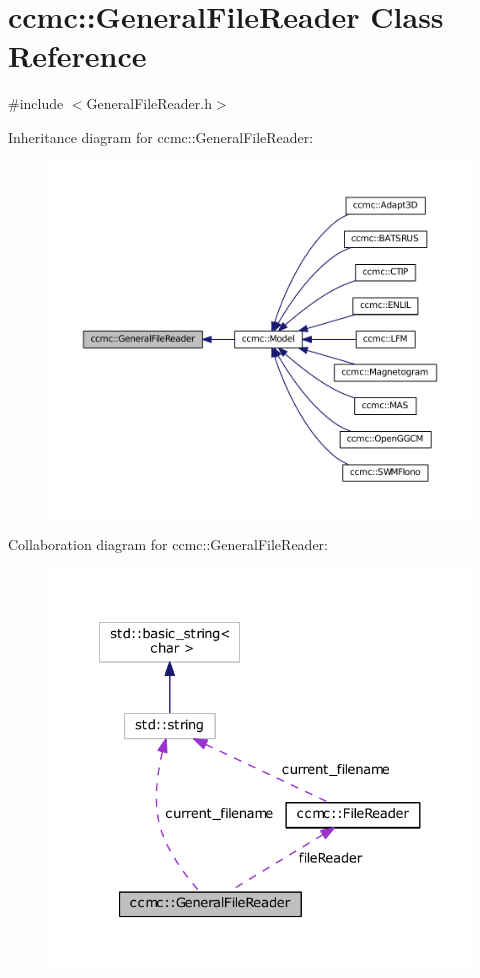 \hypertarget{classccmc_1_1_general_file_reader}{\section{ccmc\-:\-:General\-File\-Reader Class Reference}
\label{classccmc_1_1_general_file_reader}
}


{\ttfamily \#include $<$General\-File\-Reader.\-h$>$}



Inheritance diagram for ccmc\-:\-:General\-File\-Reader\-:
\nopagebreak
\begin{figure}[H]
\begin{center}
\leavevmode
\includegraphics[width=350pt]{classccmc_1_1_general_file_reader__inherit__graph}
\end{center}
\end{figure}


Collaboration diagram for ccmc\-:\-:General\-File\-Reader\-:\nopagebreak
\begin{figure}[H]
\begin{center}
\leavevmode
\includegraphics[width=324pt]{classccmc_1_1_general_file_reader__coll__graph}
\end{center}
\end{figure}
